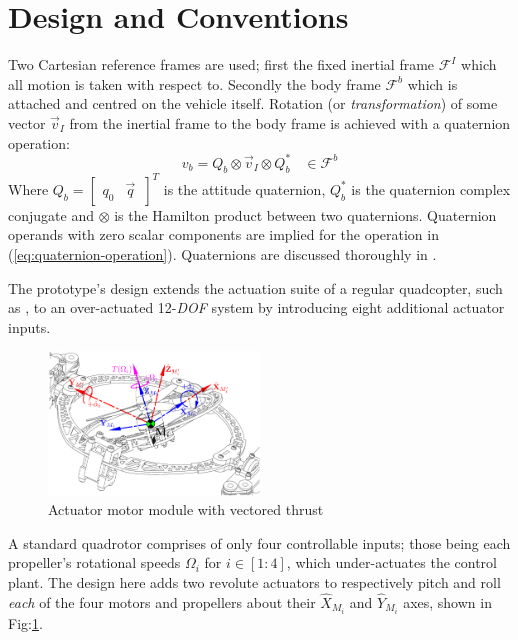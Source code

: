 \documentclass[a4paper, 10pt, conference]{ieeeconf}
\begin{document}
\section{Design and Conventions} 
\label{sec:design}
Two Cartesian reference frames are used; first the fixed inertial frame $\mathcal{F}^{I}$ which all motion is taken with respect to. Secondly the body frame $\mathcal{F}^{b}$ which is attached and centred on the vehicle itself. Rotation (or \emph{transformation}) of some vector $\vec{v}_I$ from the inertial frame to the body frame is achieved with a quaternion operation:
\begin{equation}\label{eq:quaternion-operation}
v_b=Q_b\otimes \vec{v}_I \otimes Q_b^*~~~~\in\mathcal{F}^{b}
\end{equation}
Where $Q_b=\begin{bmatrix}q_0 & \vec{q}\hspace{2pt}\end{bmatrix}^T$ is the attitude quaternion, $Q_b^*$ is the quaternion complex conjugate and $\otimes$ is the Hamilton product between two quaternions. Quaternion operands with zero scalar components are implied for the operation in (\ref{eq:quaternion-operation}). Quaternions are discussed thoroughly in \cite{shoemaker}. \par
The prototype's design extends the actuation suite of a regular quadcopter, such as \cite{x4flyer}, to an over-actuated 12-\emph{DOF} system by introducing eight additional actuator inputs.
\newpage
\begin{figure}[tbp]
\centering
\includegraphics[width=0.5\textwidth]{figs/force-redirect}
\vspace{-14pt}
\caption{Actuator motor module with vectored thrust}
\label{fig:force-redirect}
\vspace{-18pt}
\end{figure}
A standard quadrotor comprises of only four controllable inputs; those being each propeller's rotational speeds $\Omega_{i}$ for $i\in[1:4]$, which under-actuates the control plant. The design here adds two revolute actuators to respectively pitch and roll \emph{each} of the four motors and propellers about their $\hat{X}_{M_i}$ and $\hat{Y}_{M_i}$ axes, shown in Fig:\ref{fig:force-redirect}. 
\end{document}
